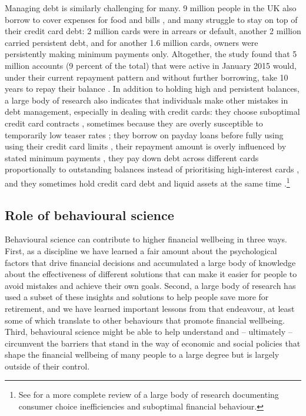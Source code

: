Managing debt is similarly challenging for many. 9 million people in the UK
also borrow to cover expenses for food and bills \citep{mps2018building}, and
many struggle to stay on top of their credit card debt: 2 million cards were in
arrears or default, another 2 million carried persistent debt, and for another
1.6 million cards, owners were persistently making minimum payments only.
Altogether, the study found that 5 million accounts (9 percent of the total)
that were active in January 2015 would, under their current repayment pattern
and without further borrowing, take 10 years to repay their balance
\citep{fca2016credit}. In addition to holding high and persistent balances, a
large body of research also indicates that individuals make other mistakes in
debt management, especially in dealing with credit cards: they choose
suboptimal credit card contracts \citep{agarwal2015consumers}, sometimes
because they are overly susceptible to temporarily low teaser rates
\citep{shui2004time, ausubel1991failure}; they borrow on payday loans before
fully using using their credit card limits \citep{agarwal2009payday}, their
repayment amount is overly influenced by stated minimum payments
\citep{sakaguchi2022default}, they pay down debt across different cards
proportionally to outstanding balances instead of prioritising high-interest
cards \citep{gathergood2019individuals}, and they sometimes hold credit card
debt and liquid assets at the same time \citep{gross2002liquidity,
    gathergood2020co}.\footnote{See \citet{agarwal2017shapes} for a more
    complete review of a large body of research documenting consumer choice
inefficiencies and suboptimal financial behaviour.}


\subsection{Role of behavioural science}%
\label{sub:role_of_behavioural_science}

Behavioural science can contribute to higher financial wellbeing in three ways.
First, as a discipline we have learned a fair amount about the psychological
factors that drive financial decisions and accumulated a large body of
knowledge about the effectiveness of different solutions that can make it
easier for people to avoid mistakes and achieve their own goals. Second, a
large body of research has used a subset of these insights and solutions to
help people save more for retirement, and we have learned important lessons
from that endeavour, at least some of which translate to other behaviours that
promote financial wellbeing. Third, behavioural science might be able to help
understand and -- ultimately -- circumvent the barriers that stand in the way
of economic and social policies that shape the financial wellbeing of many
people to a large degree but is largely outside of their control.

